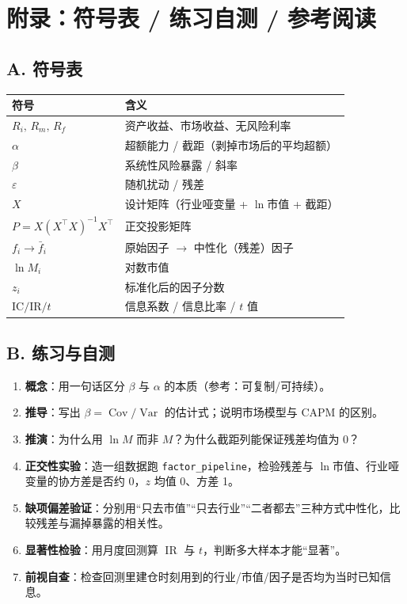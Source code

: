 \documentclass[UTF8,11pt]{ctexart}
\newcommand{\codeinl}[1]{\texttt{#1}}
\begin{document}
\section*{附录：符号表 / 练习自测 / 参考阅读}

\subsection*{A. 符号表}
\begin{center}
\renewcommand{\arraystretch}{1.4}
\begin{tabular}{@{}ll@{}}
\toprule
符号 & 含义 \\
\midrule
$R_i,\,R_m,\,R_f$ & 资产收益、市场收益、无风险利率 \\
$\alpha$ & 超额能力 / 截距（剥掉市场后的平均超额） \\
$\beta$ & 系统性风险暴露 / 斜率 \\
$\varepsilon$ & 随机扰动 / 残差 \\
$X$ & 设计矩阵（行业哑变量 + $\ln$市值 + 截距） \\
$P=X(X^{\top}X)^{-1}X^{\top}$ & 正交投影矩阵 \\
$f_i \to \bar f_i$ & 原始因子 $\to$ 中性化（残差）因子 \\
$\ln M_i$ & 对数市值 \\
$z_i$ & 标准化后的因子分数 \\
$\mathrm{IC}/\mathrm{IR}/t$ & 信息系数 / 信息比率 / $t$ 值 \\
\bottomrule
\end{tabular}
\end{center}

\subsection*{B. 练习与自测}
\begin{enumerate}[itemsep=2pt]
\item \textbf{概念}：用一句话区分 $\beta$ 与 $\alpha$ 的本质（参考：可复制/可持续）。
\item \textbf{推导}：写出 $\beta=\operatorname{Cov}/\operatorname{Var}$ 的估计式；说明市场模型与 CAPM 的区别。
\item \textbf{推演}：为什么用 $\ln M$ 而非 $M$？为什么截距列能保证残差均值为 0？
\item \textbf{正交性实验}：造一组数据跑 \codeinl{factor\_pipeline}，检验残差与 $\ln$市值、行业哑变量的协方差是否约 0，$z$ 均值 0、方差 1。
\item \textbf{缺项偏差验证}：分别用“只去市值”“只去行业”“二者都去”三种方式中性化，比较残差与漏掉暴露的相关性。
\item \textbf{显著性检验}：用月度回测算 $\operatorname{IR}$ 与 $t$，判断多大样本才能“显著”。
\item \textbf{前视自查}：检查回测里建仓时刻用到的行业/市值/因子是否均为当时已知信息。
\end{enumerate}
\end{document}
